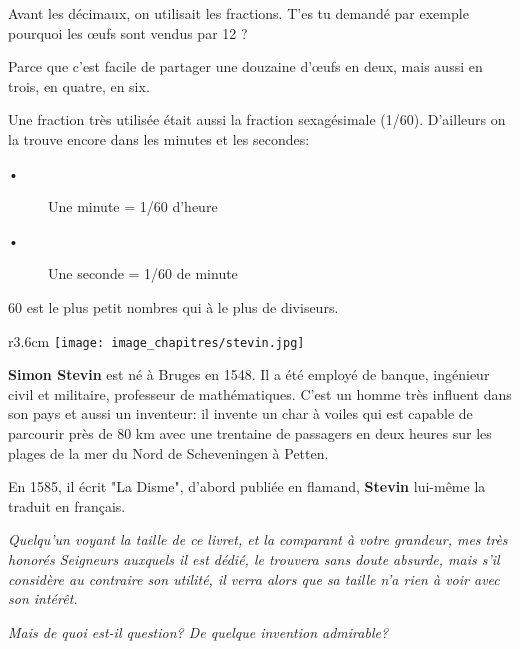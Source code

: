 
\begin{His}
Avant les décimaux, on utilisait les fractions. T'es tu demandé par exemple pourquoi les œufs sont vendus par 12 ?

Parce que c'est facile de partager une douzaine d'œufs en deux, mais aussi en trois, en quatre, en six.

Une fraction très utilisée était aussi la fraction sexagésimale (1/60). D'ailleurs on la trouve encore dans les minutes et les secondes: 
\begin{description}
\item[•] Une minute = 1/60 d’heure
\item[•] Une seconde = 1/60 de minute
\end{description}

60 est le plus petit nombres qui à le plus de diviseurs.

\vspace{0.4cm}
\begin{wrapfigure}[10]{r}{3.6cm}
\vspace{-7mm}
\texttt{[image: image\_chapitres/stevin.jpg]}
\end{wrapfigure}
\textbf{Simon \textbf{Stevin}} est né à Bruges en 1548. Il a été employé de banque, ingénieur civil et militaire, professeur de mathématiques. C'est un homme très influent dans son pays et aussi un inventeur: il invente un char à voiles qui est capable de parcourir près de 80 km avec une trentaine de passagers en deux heures sur les plages de la mer du Nord de Scheveningen à Petten.

\vspace{0.2cm}
En 1585, il écrit "La Disme", d'abord publiée en flamand, \textbf{Stevin} lui-même la traduit en français.

\vspace{0.2cm}

\textit{Quelqu'un voyant la taille de ce livret, et la comparant à votre grandeur, mes très honorés  Seigneurs auxquels il est dédié, le trouvera sans doute absurde, mais s'il considère au contraire son utilité, il verra alors que sa taille n'a rien à voir avec son intérêt.}

\textit{Mais de quoi est-il question?  De quelque invention admirable?}
 

\end{His}
